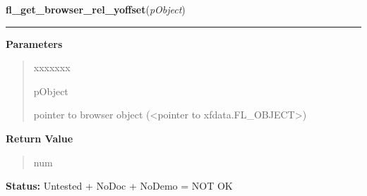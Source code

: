 \hspace{.8\funcindent}\begin{boxedminipage}{\funcwidth}

    \raggedright \textbf{fl\_get\_browser\_rel\_yoffset}(\textit{pObject})

    \vspace{-1.5ex}

    \rule{\textwidth}{0.5\fboxrule}
\setlength{\parskip}{2ex}
\setlength{\parskip}{1ex}
      \textbf{Parameters}
      \vspace{-1ex}

      \begin{quote}
        \begin{Ventry}{xxxxxxx}

          \item[pObject]

          pointer to browser object ({\textless}pointer to 
          xfdata.FL\_OBJECT{\textgreater})

        \end{Ventry}

      \end{quote}

      \textbf{Return Value}
    \vspace{-1ex}

      \begin{quote}
      num

      \end{quote}

\textbf{Status:} Untested + NoDoc + NoDemo = NOT OK



    \end{boxedminipage}

    \label{xformslib:library:fl_set_browser_yoffset}

    \vspace{0.5ex}


